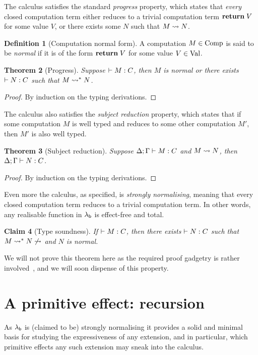 \documentclass[12pt,phd,lfcs,twoside,openright,logo,leftchapter,normalheadings]{infthesis}
\theoremstyle{plain}
\newtheorem{theorem}{Theorem}[chapter]
\newtheorem{corollary}[theorem]{Corollary}
\newtheorem{claim}[theorem]{Claim}
\theoremstyle{definition}
\newtheorem{definition}[theorem]{Definition}
\begin{document}
%
The calculus satisfies the standard \emph{progress} property, which
states that \emph{every} closed computation term either reduces to a
trivial computation term $\mathbf{return}\;V$ for some value $V$, or there
exists some $N$ such that $M \leadsto N$.
%
\begin{definition}[Computation normal form]\label{def:base-language-comp-normal}
  A computation $M \in \textrm{Comp}$ is said to be \emph{normal} if it is
  of the form $\mathbf{return}\; V$ for some value $V \in \textrm{Val}$.
\end{definition}
%
\begin{theorem}[Progress]\label{thm:base-language-progress}
  Suppose $\vdash M : C$, then $M$ is normal or there exists
  $\vdash N : C$ such that $M \leadsto^\ast N$.
\end{theorem}
%
\begin{proof}
  By induction on the typing derivations.
\end{proof}
%
%
The calculus also satisfies the \emph{subject reduction} property,
which states that if some computation $M$ is well typed and reduces to
some other computation $M'$, then $M'$ is also well typed.
%
\begin{theorem}[Subject reduction]\label{thm:base-language-preservation}
  Suppose $\Delta;\Gamma \vdash M : C$ and $M \leadsto N$, then
  $\Delta;\Gamma \vdash N : C$.
\end{theorem}
%
\begin{proof}
  By induction on the typing derivations.
\end{proof}

Even more the calculus, as specified, is \emph{strongly normalising},
meaning that every closed computation term reduces to a trivial
computation term. In other words, any realisable function in $\lambda_{\mathsf{b}}$
is effect-free and total.
%
\begin{claim}[Type soundness]\label{clm:soundness}
  If $\vdash M : C$, then there exists $\vdash N : C$ such that
  $M \leadsto^\ast N \not\leadsto$ and $N$ is normal.
\end{claim}
%
We will not prove this theorem here as the required proof gadgetry is
rather involved~\cite{LindleyS05}, and we will soon dispense of this
property.

\section{A primitive effect: recursion}
\label{sec:base-language-recursion}
%
As $\lambda_{\mathsf{b}}$ is (claimed to be) strongly normalising it provides a
solid and minimal basis for studying the expressiveness of any
extension, and in particular, which primitive effects any such
extension may sneak into the calculus.
\end{document}
